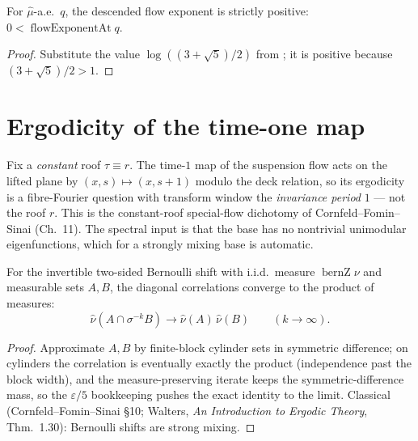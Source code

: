 \begin{theorem}\label{thm:susp-catFlowExpPos}
  \leanok
  For $\hat\mu$-a.e.\ $q$, the descended flow exponent is strictly positive:
  $0 < \operatorname{flowExponentAt} q$.
\end{theorem}
\begin{proof}\leanok
  Substitute the value $\log((3+\sqrt5)/2)$ from ; it is positive
  because $(3+\sqrt5)/2 > 1$.
\end{proof}

\section{Ergodicity of the time-one map}

Fix a \emph{constant} roof $\tau \equiv r$. The time-$1$ map of the suspension flow acts on the
lifted plane by $(x, s) \mapsto (x, s + 1)$ modulo the deck relation, so its ergodicity is a
fibre-Fourier question with transform window the \emph{invariance period} $1$ --- not the roof $r$.
This is the constant-roof special-flow dichotomy of Cornfeld--Fomin--Sinai (Ch.~11). The spectral
input is that the base has no nontrivial unimodular eigenfunctions, which for a strongly mixing base
is automatic.

\begin{theorem}\label{thm:susp-bernMixing}
  \leanok
  For the invertible two-sided Bernoulli shift with i.i.d.\ measure $\operatorname{bernZ}\nu$ and
  measurable sets $A, B$, the diagonal correlations converge to the product of measures:
  \[
    \hat\nu(A \cap \sigma^{-k} B) \to \hat\nu(A)\,\hat\nu(B) \qquad (k \to \infty).
  \]
\end{theorem}
\begin{proof}\leanok
  Approximate $A, B$ by finite-block cylinder sets in symmetric difference; on cylinders the
  correlation is eventually exactly the product (independence past the block width), and the
  measure-preserving iterate keeps the symmetric-difference mass, so the $\varepsilon/5$
  bookkeeping pushes the exact identity to the limit. Classical (Cornfeld--Fomin--Sinai \S10;
  Walters, \emph{An Introduction to Ergodic Theory}, Thm.~1.30): Bernoulli shifts are strong mixing.
\end{proof}

